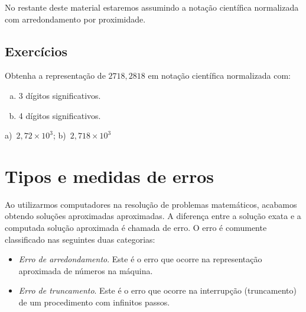 No restante deste material estaremos assumindo a notação científica normalizada com arredondamento por proximidade.

\subsection*{Exercícios}

\begin{exer}
  Obtenha a representação de $2718,2818$ em notação científica normalizada com:
  \begin{enumerate}[a)]
  \item 3 dígitos significativos.
  \item 4 dígitos significativos.
  \end{enumerate}
\end{exer}
\begin{resp}
  a)~$2,72\times 10^3$; b)~$2,718\times 10^3$
\end{resp}


\section{Tipos e medidas de erros}\label{cap_aritm_sec_erros}

Ao utilizarmos computadores na resolução de problemas matemáticos, acabamos obtendo soluções aproximadas aproximadas. A diferença entre a solução exata e a computada solução aproximada é chamada de erro. O erro é comumente classificado nas seguintes duas categorias:
\begin{itemize}
\item \emph{Erro de arredondamento}. Este é o erro que ocorre na representação aproximada de números na máquina.
\item \emph{Erro de truncamento}. Este é o erro que ocorre na interrupção (truncamento) de um procedimento com infinitos passos.
\end{itemize}

